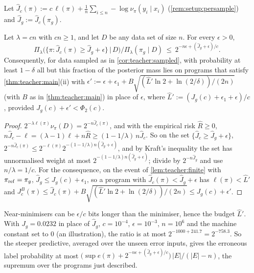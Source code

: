 Let $\hat J_c(\pi):=c\,\ell(\pi)+\frac1n\sum_{i\le n}-\log\nu_\pi(y_i\mid x_i)$ (\cref{rem:setup:persample}) and $\hat J_g:=\hat J_c(\pi_g)$.

\begin{proposition}\label{prop:teacher:concentration}
Let $\lambda=cn$ with $cn\ge1$, and let $D$ be any data set of size $n$. For every $\epsilon>0$,
\[
\Pi_\lambda\big(\{\pi:\hat J_c(\pi)\ge\hat J_g+\epsilon\}\,\big|\,D\big)\big/\Pi_\lambda(\pi_g\mid D)\ \le\ 2^{-n\epsilon+(\hat J_g+\epsilon)/c}.
\]
Consequently, for data sampled as in \cref{cor:teacher:sampled}, with probability at least $1-\delta$ all but this fraction of the posterior mass lies on programs that satisfy \cref{thm:teacher:main}(ii) with $\epsilon':=\epsilon+\epsilon_1+B\sqrt{(\hat L'\ln2+\ln(2/\delta))/(2n)}$ (with $B$ as in \cref{thm:teacher:main}) in place of $\epsilon$, where $\hat L':=(J_g(c)+\epsilon_1+\epsilon)/c$, provided $J_g(c)+\epsilon'<\Phi_2(c)$.
\end{proposition}

\begin{proof}
$2^{-\lambda\ell(\pi)}\nu_\pi(D)=2^{-n\hat J_c(\pi)}$, and with the empirical risk $\hat R\ge0$, $n\hat J_c-\ell=(\lambda-1)\ell+n\hat R\ge(1-1/\lambda)\,n\hat J_c$. So on the set $\{\hat J_c\ge\hat J_g+\epsilon\}$, $2^{-n\hat J_c(\pi)}\le2^{-\ell(\pi)}2^{-(1-1/\lambda)n(\hat J_g+\epsilon)}$, and by Kraft's inequality the set has unnormalised weight at most $2^{-(1-1/\lambda)n(\hat J_g+\epsilon)}$; divide by $2^{-n\hat J_g}$ and use $n/\lambda=1/c$. For the consequence, on the event of \cref{lem:teacher:finite} with $\pi_{\rm ref}=\pi_g$, $\hat J_g\le J_g(c)+\epsilon_1$, so a program with $\hat J_c(\pi)<\hat J_g+\epsilon$ has $\ell(\pi)<\hat L'$ and $J^B_c(\pi)\le\hat J_c(\pi)+B\sqrt{(\hat L'\ln2+\ln(2/\delta))/(2n)}\le J_g(c)+\epsilon'$.
\end{proof}

Near-minimisers can be $\epsilon/c$ bits longer than the minimiser, hence the budget $\hat L'$. With $J_g=0.0232$ in place of $\hat J_g$, $c=10^{-4}$, $\epsilon=10^{-3}$, $n=10^6$ and the machine constant set to $0$ (an illustration), the ratio is at most $2^{-1000+241.7}=2^{-758.3}$. So the steeper predictive, averaged over the unseen error inputs, gives the erroneous label probability at most $\big(\sup e(\pi)+2^{-n\epsilon+(\hat J_g+\epsilon)/c}\big)\,|E|/(|E|-n)$, the supremum over the programs just described.

